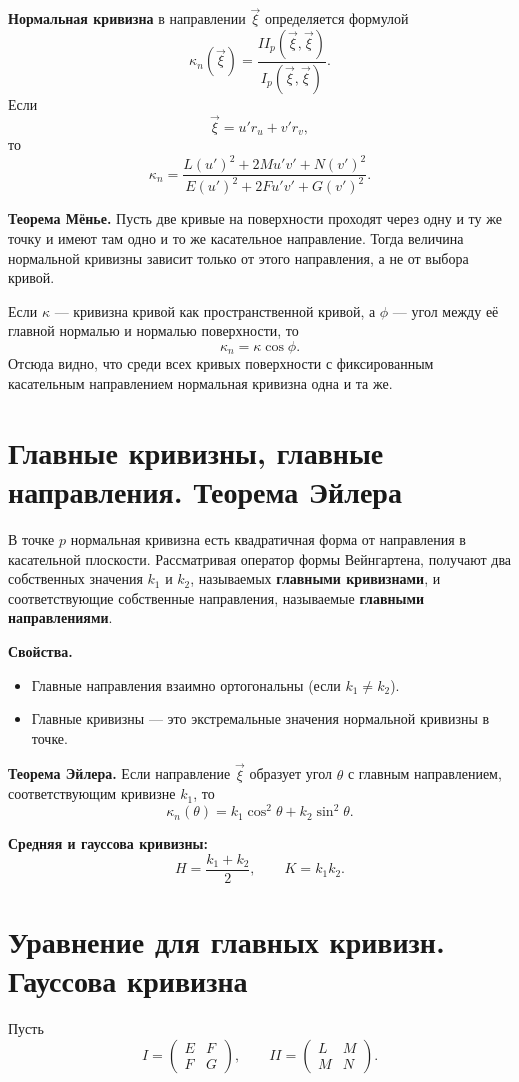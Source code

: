 \documentclass[12pt,a4paper]{article}
\begin{document}
\textbf{Нормальная кривизна} в направлении $\vec{\xi}$ определяется формулой
\[
\kappa_n(\vec{\xi})=\frac{II_p(\vec{\xi},\vec{\xi})}{I_p(\vec{\xi},\vec{\xi})}.
\]
Если
\[
\vec{\xi}=u' r_u+v' r_v,
\]
то
\[
\kappa_n=
\frac{L(u')^2+2Mu'v'+N(v')^2}{E(u')^2+2Fu'v'+G(v')^2}.
\]

\textbf{Теорема Мёнье.}
Пусть две кривые на поверхности проходят через одну и ту же точку
и имеют там одно и то же касательное направление.
Тогда величина нормальной кривизны зависит только от этого направления,
а не от выбора кривой.

Если $\kappa$ --- кривизна кривой как пространственной кривой, а $\phi$ ---
угол между её главной нормалью и нормалью поверхности, то
\[
\kappa_n=\kappa\cos\phi.
\]
Отсюда видно, что среди всех кривых поверхности с фиксированным касательным
направлением нормальная кривизна одна и та же.

\section{Главные кривизны, главные направления. Теорема Эйлера}

В точке $p$ нормальная кривизна есть квадратичная форма от направления в касательной плоскости.
Рассматривая оператор формы Вейнгартена, получают два собственных значения
$k_1$ и $k_2$, называемых \textbf{главными кривизнами}, и соответствующие
собственные направления, называемые \textbf{главными направлениями}.

\textbf{Свойства.}
\begin{itemize}
  \item Главные направления взаимно ортогональны
  (если $k_1\neq k_2$).
  \item Главные кривизны --- это экстремальные значения нормальной кривизны в точке.
\end{itemize}

\textbf{Теорема Эйлера.}
Если направление $\vec{\xi}$ образует угол $\theta$ с главным направлением,
соответствующим кривизне $k_1$, то
\[
\kappa_n(\theta)=k_1\cos^2\theta+k_2\sin^2\theta.
\]

\textbf{Средняя и гауссова кривизны:}
\[
H=\frac{k_1+k_2}{2},
\qquad
K=k_1k_2.
\]

\section{Уравнение для главных кривизн. Гауссова кривизна}

Пусть
\[
I=
\begin{pmatrix}
E & F\\
F & G
\end{pmatrix},
\qquad
II=
\begin{pmatrix}
L & M\\
M & N
\end{pmatrix}.
\]
\end{document}
